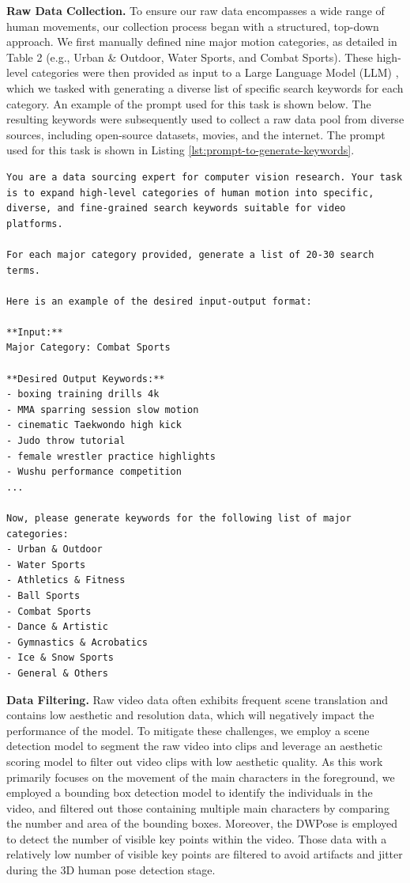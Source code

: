 \noindent\textbf{Raw Data Collection.}
To ensure our raw data encompasses a wide range of human movements, our collection process began with a structured, top-down approach. We first manually defined nine major motion categories, as detailed in Table 2 (e.g., Urban \& Outdoor, Water Sports, and Combat Sports). These high-level categories were then provided as input to a Large Language Model (LLM) \citep{gimini}, which we tasked with generating a diverse list of specific search keywords for each category. An example of the prompt used for this task is shown below. The resulting keywords were subsequently used to collect a raw data pool from diverse sources, including open-source datasets, movies, and the internet. The prompt used for this task is shown in Listing \ref{lst:prompt-to-generate-keywords}.
\begin{lstlisting}[style=promptstyle, caption={\reb{The prompt used to expand major categories into specific search keywords via an LLM.}}, label={lst:prompt-to-generate-keywords}]
You are a data sourcing expert for computer vision research. Your task is to expand high-level categories of human motion into specific, diverse, and fine-grained search keywords suitable for video platforms.

For each major category provided, generate a list of 20-30 search terms.

Here is an example of the desired input-output format:

**Input:**
Major Category: Combat Sports

**Desired Output Keywords:**
- boxing training drills 4k
- MMA sparring session slow motion
- cinematic Taekwondo high kick
- Judo throw tutorial
- female wrestler practice highlights
- Wushu performance competition
...

Now, please generate keywords for the following list of major categories:
- Urban & Outdoor
- Water Sports
- Athletics & Fitness
- Ball Sports
- Combat Sports
- Dance & Artistic
- Gymnastics & Acrobatics
- Ice & Snow Sports
- General & Others
\end{lstlisting}

\noindent\textbf{Data Filtering.}
Raw video data often exhibits frequent scene translation and contains low aesthetic and resolution data, which will negatively impact the performance of the model. To mitigate these challenges, we employ a scene detection model to segment the raw video into clips and leverage an aesthetic scoring model to filter out video clips with low aesthetic quality. As this work primarily focuses on the movement of the main characters in the foreground, we employed a bounding box detection model to identify the individuals in the video, and filtered out those containing multiple main characters by comparing the number and area of the bounding boxes. Moreover, the DWPose\citep{yang2023effective} is employed to detect the number of visible key points within the video. Those data with a relatively low number of visible key points are filtered to avoid artifacts and jitter during the 3D human pose detection stage. 


